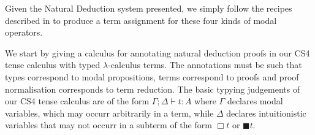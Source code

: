 Given the Natural Deduction system presented, we simply follow the
recipes described in \cite{barber1997} to produce a term assignment
for these four kinds of modal operators.

We start by giving a calculus for annotating natural deduction proofs
in our CS4 tense calculus with typed $\lambda$-calculus terms. The
annotations must be such that types correspond to modal propositions,
terms correspond to proofs and proof normalisation corresponds to term
reduction. The basic typying judgements of our CS4 tense calculus are
of the form $\Gamma ; \Delta\vdash t\colon A$ where $\Gamma$ declares
modal variables, which may occurr arbitrarily in a term, while
$\Delta$ declares intuitionistic variables that may not occurr in a
subterm of the form $\Box t$ or $\blacksquare t$.
